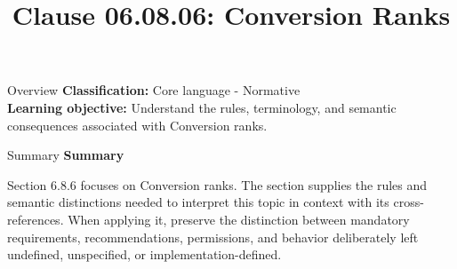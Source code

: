 \documentclass[10pt,letterpaper]{article}
\title{Clause 06.08.06: Conversion Ranks}
\author{}
\date{}
\begin{document}
\maketitle
\begin{CornellOverviewBox}{Overview}
\textbf{Classification:} Core language - Normative\\[2pt]
\textbf{Learning objective:} Understand the rules, terminology, and semantic consequences associated with Conversion ranks.
\end{CornellOverviewBox}\begin{CornellSummaryBox}{Summary}
{\sffamily\bfseries\color{Accent} Summary}\par\vspace{3pt}Section 6.8.6 focuses on Conversion ranks. The section supplies the rules and semantic distinctions needed to interpret this topic in context with its cross-references. When applying it, preserve the distinction between mandatory requirements, recommendations, permissions, and behavior deliberately left undefined, unspecified, or implementation-defined.
\end{CornellSummaryBox}
\end{document}
